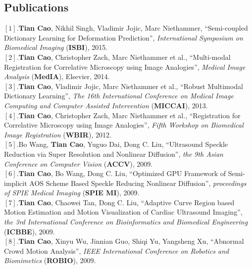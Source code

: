 \documentclass[line,margin]{res}
\begin{document}
\begin{resume}
\vspace{-.1in}


\section{\sc Publications}  
\smallskip
$[1]$.\textbf{Tian Cao}, Nikhil Singh, Vladimir Jojic, Marc Niethammer, ``Semi-coupled Dictionary Learning for Deformation Prediction'', \emph{International Symposium on Biomedical Imaging} (\textbf{ISBI}), 2015. \vspace{.05in}\\
$[2]$.\textbf{Tian Cao}, Christopher Zach, Marc Niethammer et al., ``Multi-modal Registration for Correlative Microscopy using Image Analogies'', \emph{Medical Image Analysis} (\textbf{MedIA}), Elsevier, 2014. \vspace{.05in}\\
$[3]$.\textbf{Tian Cao}, Vladimir Jojic, Marc Niethammer et al., ``Robust Multimodal Dictionary Learning'', \emph{The 16th International Conference on Medical Image Computing and Computer Assisted Intervention} (\textbf{MICCAI}), 2013. \vspace{.05in}\\ 
$[4]$.\textbf{Tian Cao}, Christopher Zach, Marc Niethammer et al., ``Registration for Correlative Microscopy using Image Analogies'',  \emph{Fifth Workshop on Biomedical Image Registration} (\textbf{WBIR}), 2012. \vspace{.05in}\\%
$[5]$.Bo Wang, \textbf{Tian Cao}, Yuguo Dai, Dong C. Liu, ``Ultrasound Speckle Reduction via Super Resolution and Nonlinear Diffusion'',  \emph{the 9th Asian Conference on Computer Vision} (\textbf{ACCV}), 2009. \vspace{.05in}\\
$[6]$.\textbf{Tian Cao}, Bo Wang, Dong C. Liu, ``Optimized GPU Framework of Semi-implicit AOS
Scheme Based Speckle Reducing Nonlinear Diffusion'',  \emph{proceedings of SPIE Medical Imaging} (\textbf{SPIE MI}), 2009.\vspace{.05in}\\%
$[7]$.\textbf{Tian Cao}, Chaowei Tan, Dong C. Liu, ``Adaptive Curve Region based Motion Estimation and Motion Visualization of Cardiac Ultrasound Imaging'',  \emph{the 3rd International Conference on Bioinformatics and Biomedical Engineering} (\textbf{ICBBE}), 2009.\vspace{.05in}\\
$[8]$.\textbf{Tian Cao}, Xinyu Wu, Jinnian Guo, Shiqi Yu, Yangsheng Xu, ``Abnormal Crowd Motion Analysis'', \emph{IEEE International Conference on Robotics and Biomimetics} (\textbf{ROBIO}), 2009.


\end{resume}
\end{document}
